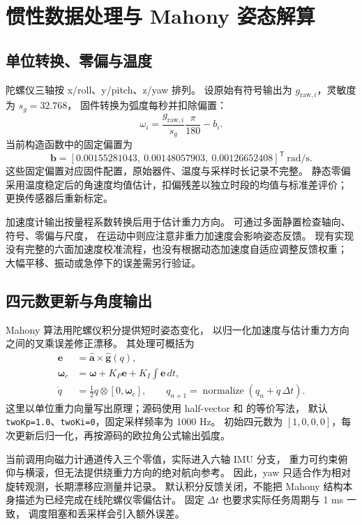 \section{惯性数据处理与 Mahony 姿态解算}
\subsection{单位转换、零偏与温度}
陀螺仪三轴按 x/roll、y/pitch、z/yaw 排列。
设原始有符号输出为 $g_{\mathrm{raw},i}$，灵敏度为 $s_g=32.768$，
固件转换为弧度每秒并扣除偏置：
\begin{equation}
\omega_i=\frac{g_{\mathrm{raw},i}}{s_g}\frac{\pi}{180}-b_i.
\end{equation}
当前构造函数中的固定偏置为
\begin{equation}
\boldsymbol b=
[0.00155281043,\ 0.00148057903,\ 0.00126652408]^{\mathsf T}
\ \mathrm{rad/s}.
\end{equation}
这些固定偏置对应固件配置，原始器件、温度与采样时长记录不完整。
静态零偏采用温度稳定后的角速度均值估计，扣偏残差以独立时段的均值与标准差评价；
更换传感器后重新标定。

加速度计输出按量程系数转换后用于估计重力方向。
可通过多面静置检查轴向、符号、零偏与尺度，
在运动中则应注意非重力加速度会影响姿态反馈。
现有实现没有完整的六面加速度校准流程，也没有根据动态加速度自适应调整反馈权重；
大幅平移、振动或急停下的误差需另行验证。

\subsection{四元数更新与角度输出}
Mahony 算法用陀螺仪积分提供短时姿态变化，
以归一化加速度与估计重力方向之间的叉乘误差修正漂移。
其处理可概括为
\begin{align}
\boldsymbol e&=\hat{\boldsymbol a}\times\hat{\boldsymbol g}(q),\\
\boldsymbol\omega_c&=\boldsymbol\omega+
K_P\boldsymbol e+K_I\int\boldsymbol e\,dt,\\
\dot q&=\tfrac12q\otimes[0,\boldsymbol\omega_c],\qquad
q_{n+1}=\operatorname{normalize}(q_n+\dot q\,\Delta t).
\end{align}
这里以单位重力向量写出原理；源码使用 half-vector 和  的等价写法，
默认 \texttt{twoKp=1.0}、\texttt{twoKi=0}，固定采样频率为 1000 Hz。
初始四元数为 $[1,0,0,0]$，每次更新后归一化，再按源码的欧拉角公式输出弧度。

当前调用向磁力计通道传入三个零值，实际进入六轴 IMU 分支，
重力可约束俯仰与横滚，但无法提供绕重力方向的绝对航向参考。
因此，yaw 只适合作为相对旋转观测，长期漂移应测量并记录。
默认积分反馈关闭，不能把 Mahony 结构本身描述为已经完成在线陀螺仪零偏估计。
固定 $\Delta t$ 也要求实际任务周期与 1 ms 一致，
调度阻塞和丢采样会引入额外误差。

